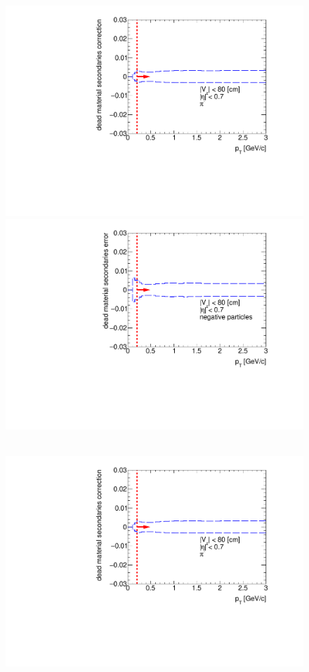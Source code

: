 \begin{figure}[hb]
{  \includegraphics[width=\linewidth,page=3]{graphics/systematicsEfficiency/deadMaterial/secondaries_Unbinned_SDCD_1D.pdf}\\
  \includegraphics[width=\linewidth,page=1]{graphics/systematicsEfficiency/deadMaterial/secondaries_Unbinned_Charged_SDCD1D.pdf}\\
}~
\parbox{0.495\textwidth}{
  \centering
  \includegraphics[width=\linewidth,page=4]{graphics/systematicsEfficiency/deadMaterial/secondaries_Unbinned_SDCD_1D.pdf}\\
}
\end{figure}
